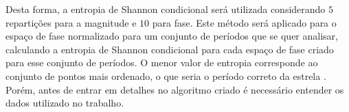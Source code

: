 Desta forma, a entropia de Shannon condicional será utilizada considerando $5$ repartições para a magnitude e $10$ para fase. Este método será aplicado para o espaço de fase normalizado para um conjunto de períodos que se quer analisar, calculando a entropia de Shannon condicional para cada espaço de fase criado para esse conjunto de períodos. O menor valor de entropia corresponde ao conjunto de pontos mais ordenado, o que seria o período correto da estrela \citep{ce} . Porém, antes de entrar em detalhes no algoritmo criado é necessário entender os dados utilizado no trabalho.


%
%
%
